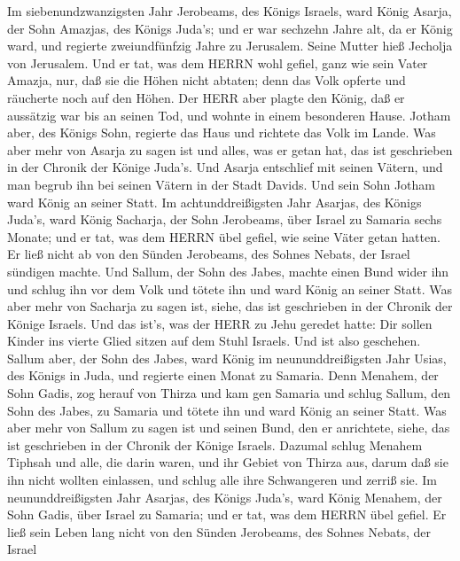  Im siebenundzwanzigsten Jahr Jerobeams, des Königs Israels,
ward König Asarja, der Sohn Amazjas, des Königs Juda's;  und
er war sechzehn Jahre alt, da er König ward, und regierte zweiundfünfzig
Jahre zu Jerusalem. Seine Mutter hieß Jecholja von Jerusalem.
 Und er tat, was dem HERRN wohl gefiel, ganz wie sein Vater
Amazja,  nur, daß sie die Höhen nicht abtaten; denn das Volk
opferte und räucherte noch auf den Höhen.  Der HERR aber
plagte den König, daß er aussätzig war bis an seinen Tod, und wohnte in
einem besonderen Hause. Jotham aber, des Königs Sohn, regierte das Haus
und richtete das Volk im Lande.  Was aber mehr von Asarja zu
sagen ist und alles, was er getan hat, das ist geschrieben in der
Chronik der Könige Juda's.  Und Asarja entschlief mit seinen
Vätern, und man begrub ihn bei seinen Vätern in der Stadt Davids. Und
sein Sohn Jotham ward König an seiner Statt.  Im
achtunddreißigsten Jahr Asarjas, des Königs Juda's, ward König Sacharja,
der Sohn Jerobeams, über Israel zu Samaria sechs Monate; 
und er tat, was dem HERRN übel gefiel, wie seine Väter getan hatten. Er
ließ nicht ab von den Sünden Jerobeams, des Sohnes Nebats, der Israel
sündigen machte.  Und Sallum, der Sohn des Jabes, machte
einen Bund wider ihn und schlug ihn vor dem Volk und tötete ihn und ward
König an seiner Statt.  Was aber mehr von Sacharja zu sagen
ist, siehe, das ist geschrieben in der Chronik der Könige Israels.
 Und das ist's, was der HERR zu Jehu geredet hatte: Dir
sollen Kinder ins vierte Glied sitzen auf dem Stuhl Israels. Und ist
also geschehen.  Sallum aber, der Sohn des Jabes, ward
König im neununddreißigsten Jahr Usias, des Königs in Juda, und regierte
einen Monat zu Samaria.  Denn Menahem, der Sohn Gadis, zog
herauf von Thirza und kam gen Samaria und schlug Sallum, den Sohn des
Jabes, zu Samaria und tötete ihn und ward König an seiner Statt.
 Was aber mehr von Sallum zu sagen ist und seinen Bund, den
er anrichtete, siehe, das ist geschrieben in der Chronik der Könige
Israels.  Dazumal schlug Menahem Tiphsah und alle, die
darin waren, und ihr Gebiet von Thirza aus, darum daß sie ihn nicht
wollten einlassen, und schlug alle ihre Schwangeren und zerriß sie.
 Im neununddreißigsten Jahr Asarjas, des Königs Juda's,
ward König Menahem, der Sohn Gadis, über Israel zu Samaria;
 und er tat, was dem HERRN übel gefiel. Er ließ sein Leben
lang nicht von den Sünden Jerobeams, des Sohnes Nebats, der Israel
